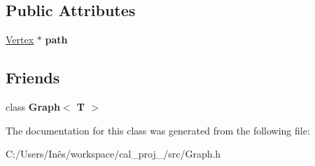 \subsection*{Public Attributes}
\begin{DoxyCompactItemize}
\item 
\hypertarget{class_vertex_abd40febd917aa25add6bd42237c8463a}{}\hyperlink{class_vertex}{Vertex} $\ast$ {\bfseries path}\label{class_vertex_abd40febd917aa25add6bd42237c8463a}

\end{DoxyCompactItemize}
\subsection*{Friends}
\begin{DoxyCompactItemize}
\item 
\hypertarget{class_vertex_aefa9b76cd57411c5354e5620dc2d84dd}{}class {\bfseries Graph$<$ T $>$}\label{class_vertex_aefa9b76cd57411c5354e5620dc2d84dd}

\end{DoxyCompactItemize}


The documentation for this class was generated from the following file\+:\begin{DoxyCompactItemize}
\item 
C\+:/\+Users/\+Inês/workspace/cal\+\_\+proj\+\_/src/Graph.\+h\end{DoxyCompactItemize}
